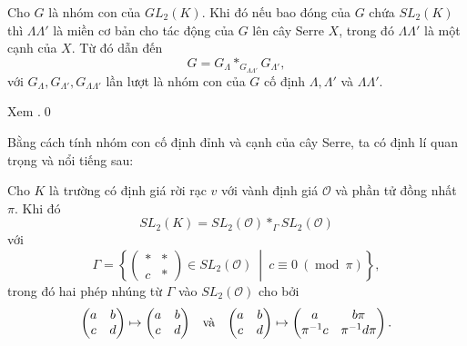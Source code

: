 \begin{theorem}
    Cho $G$ là nhóm con của $GL_2(K)$. Khi đó nếu bao đóng của $G$ chứa $SL_2(K)$ thì $\Lambda \Lambda'$ là miền cơ bản cho tác động của $G$ lên cây Serre $X$, trong đó $\Lambda \Lambda'$ là một cạnh của $X$. Từ đó dẫn đến
    $$
        G = G_{\Lambda} *_{G_{\Lambda \Lambda'}} G_{\Lambda'},
    $$
    với $G_{\Lambda}, G_{\Lambda'}, G_{\Lambda \Lambda'}$ lần lượt là nhóm con của $G$ cố định $\Lambda, \Lambda'$ và $\Lambda \Lambda'$.
\end{theorem}

\startproof Xem \cite[Chương 2, Mục 1.4, Định lí 2 và Định lí 3]{TreeSerre}.\qed

Bằng cách tính nhóm con cố định đỉnh và cạnh của cây Serre, ta có định lí quan trọng và nổi tiếng sau:

\begin{theorem}
    Cho $K$ là trường có định giá rời rạc $v$ với vành định giá $\mathcal{O}$ và phần tử đồng nhất $\pi$. Khi đó
    $$
        SL_2(K) = SL_2(\mathcal{O}) *_\Gamma SL_2(\mathcal{O})
    $$
    với
    $$
        \Gamma = \left\{ \begin{pmatrix}
            * & * \\
            c & *
        \end{pmatrix} \in SL_2(\mathcal{O})\ \middle|\ c \equiv 0\ (\operatorname*{mod}\ \pi) \right\},
    $$
    trong đó hai phép nhúng từ $\Gamma$ vào $SL_2(\mathcal{O})$ cho bởi
    $$
        \begin{pmatrix}
            a & b \\
            c & d
        \end{pmatrix} \mapsto \begin{pmatrix}
            a & b \\
            c & d
        \end{pmatrix}\enskip \text{ và }\enskip \begin{pmatrix}
            a & b \\
            c & d
        \end{pmatrix} \mapsto \begin{pmatrix}
            a         & b\pi         \\
            \pi^{-1}c & \pi^{-1}d\pi
        \end{pmatrix}.
    $$

\end{theorem}


